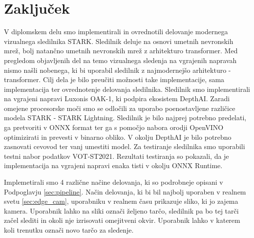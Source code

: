 \documentclass[a4paper,12pt,openright]{book}
\begin{document}


\chapter{Zaključek}
\label{ch:5}
V diplomskem delu smo implementirali in ovrednotili delovanje modernega vizualnega sledilnika STARK. Sledilnik deluje na osnovi umetnih nevronskih mrež, bolj natančno umetnih nevronskih mrež z arhitekturo transformer. Med pregledom objavljenih del na temo vizualnega sledenja na vgrajenih napravah nismo našli nobenega, ki bi uporabil sledilnik z najmodernejšo arhitekturo - transformer. Cilj dela je bilo preučiti možnosti take implementacije, sama implementacija ter ovrednotenje delovanja sledilnika. Sledilnik smo implementirali na vgrajeni napravi Luxonis OAK-1, ki podpira ekosistem DepthAI. Zaradi omejene procesorske moči smo se odločili za uporabo poenostavljene različice modela STARK - STARK Lightning. Sledilnik je bilo najprej potrebno predelati, ga pretvoriti v ONNX format ter ga s pomočjo nabora orodji OpenVINO optimizirati in prevesti v binarno obliko. V okolju DepthAI je bilo potrebno zasnovati cevovod ter vanj umestiti model. Za testiranje sledilnika smo uporabili testni nabor podatkov VOT-ST2021. Rezultati testiranja so pokazali, da je implementacija na vgrajeni napravi enaka tisti v okolju ONNX Runtime.

Implemetirali smo 4 različne načine delovanja, ki so podrobneje opisani v Podpoglavju \ref{sec:pipeline}. Način delovanja, ki bi bil najbolj uporaben v realnem svetu \ref{sec:edge_cam}, uporabniku v realnem času prikazuje sliko, ki jo zajema kamera. Uporabnik lahko na sliki označi željeno tarčo, sledilnik pa bo tej tarči začel slediti in okoli nje izrisovati omejitveni okvir. Uporabnik lahko v katerem koli trenutku označi novo tarčo za sledenje.
\end{document}
